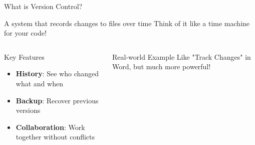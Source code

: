 \documentclass[aspectratio=169]{beamer}
\begin{document}
\begin{frame}{What is Version Control?}
  \begin{block}{A system that records changes to files over time}
    Think of it like a time machine for your code!
  \end{block}
  
  \begin{columns}
    \begin{column}{0.5\textwidth}
      \begin{block}{Key Features}
        \begin{itemize}
          \item \textbf{History}: See who changed what and when
          \item \textbf{Backup}: Recover previous versions
          \item \textbf{Collaboration}: Work together without conflicts
        \end{itemize}
      \end{block}
    \end{column}
    \begin{column}{0.45\textwidth}
      \begin{exampleblock}{Real-world Example}
        Like "Track Changes" in Word, but much more powerful!
      \end{exampleblock}
    \end{column}
  \end{columns}
\end{frame}
\end{document}
